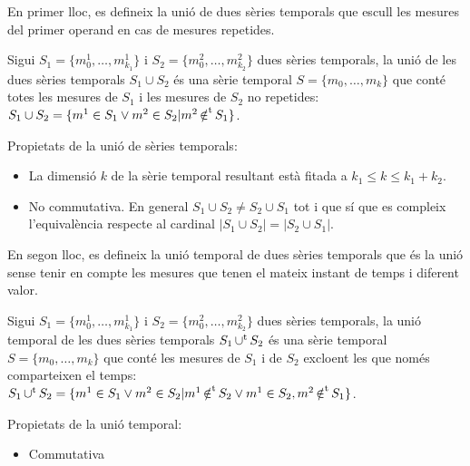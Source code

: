 En primer lloc, es defineix la unió de dues sèries temporals que
escull les mesures del primer operand en cas de mesures repetides.
\begin{definition}[unió]
  Sigui $S_1=\{m_0^1, \dotsc, m_{k_1}^1\}$ i $S_2=\{m_0^2, \dotsc,
  m_{k_2}^2\}$ dues sèries temporals, la unió de les dues
  sèries temporals $S_1 \cup S_2$ és una sèrie temporal $S=\{m_0,
  \dotsc, m_k\}$ que conté totes les mesures de $S_1$ i les mesures de
  $S_2$ no repetides: $S_1 \cup S_2 = \{m^1 \in S_1 \vee m^2 \in S_2
  | m^2 \operatorname*{\notin^t} S_1 \}$.
\end{definition}

Propietats de la unió de sèries temporals:
\begin{itemize}
\item La dimensió $k$ de la sèrie temporal resultant està fitada a
  $k_1 \leq k \leq k_1 + k_2$. 
\item No commutativa. En general
  $S_1\cup S_2 \neq S_2\cup S_1$ tot i que sí que es compleix
  l'equivalència respecte al cardinal $|S_1 \cup S_2| = |S_2\cup S_1|$.
\end{itemize}

En segon lloc, es defineix la unió temporal de dues sèries temporals
que és la unió sense tenir en compte les mesures que tenen el mateix
instant de temps i diferent valor.
\begin{definition}
  Sigui $S_1=\{m_0^1, \dotsc, m_{k_1}^1\}$ i $S_2=\{m_0^2, \dotsc,
  m_{k_2}^2\}$ dues sèries temporals, la unió temporal de les dues
  sèries temporals $S_1 \operatorname*{\cup^t} S_2$ és una sèrie temporal $S=\{m_0,
  \dotsc, m_k\}$ que conté les mesures de $S_1$ i de $S_2$ excloent
  les que només comparteixen el temps: $S_1 \operatorname*{\cup^t} S_2 = \{ m^1 \in S_1
  \vee m^2 \in S_2 | m^1 \operatorname*{\notin^t} S_2 \vee m^1 \in S_2, m^2 \operatorname*{\notin^t}
  S_1 \}$.
\end{definition}


Propietats de la unió temporal:
\begin{itemize}
\item Commutativa
\end{itemize}





